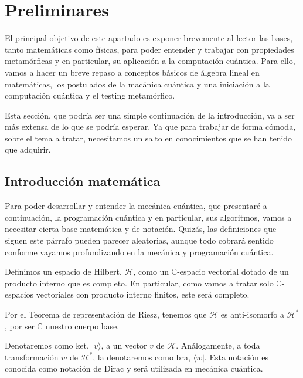 \cleardoublepage

\chapter{Preliminares}
\label{makereference}

El principal objetivo de este apartado es exponer brevemente al lector las bases, tanto matemáticas como físicas, para poder entender y trabajar con propiedades metamórficas y en particular, su aplicación a la computación cuántica. Para ello, vamos a hacer un breve repaso a conceptos básicos de álgebra lineal en matemáticas, los postulados de la macánica cuántica y una iniciación a la computación cuántica y el testing metamórfico. 

\vspace{5pt}
Esta sección, que podría ser una simple continuación de la introducción, va a ser más extensa de lo que se podría esperar. Ya que para trabajar de forma cómoda, sobre el tema a tratar, necesitamos un salto en conocimientos que se han tenido que adquirir.

\section{Introducción matemática}
Para poder desarrollar y entender la mecánica cuántica, que presentaré a continuación, la programación cuántica y en particular, sus algoritmos, vamos a necesitar cierta base matemática y de notación. Quizás, las definiciones que siguen este párrafo pueden parecer aleatorias, aunque todo cobrará sentido conforme vayamos profundizando en la mecánica y programación cuántica.

\vspace{5pt}

Definimos un espacio de Hilbert, $\mathscr{H}$, como un $\mathbb{C}$-espacio vectorial dotado de un producto interno que es completo. En particular, como vamos a tratar solo $\mathbb{C}$-espacios vectoriales con producto interno finitos, este será completo.

\vspace{5pt}

Por el Teorema de representación de Riesz, tenemos que $\mathscr{H}$ es anti-isomorfo a $\mathscr{H}^{*}$, por ser $\mathbb{C}$ nuestro cuerpo base.

\vspace{5pt}

Denotaremos como ket, $|v\rangle$, a un vector $v$ de $\mathscr{H}$. Análogamente, a toda transformación $w$ de $\mathscr{H}^{*}$, la denotaremos como bra, $\langle w|$. Esta notación es conocida como notación de Dirac y será utilizada en mecánica cuántica.

